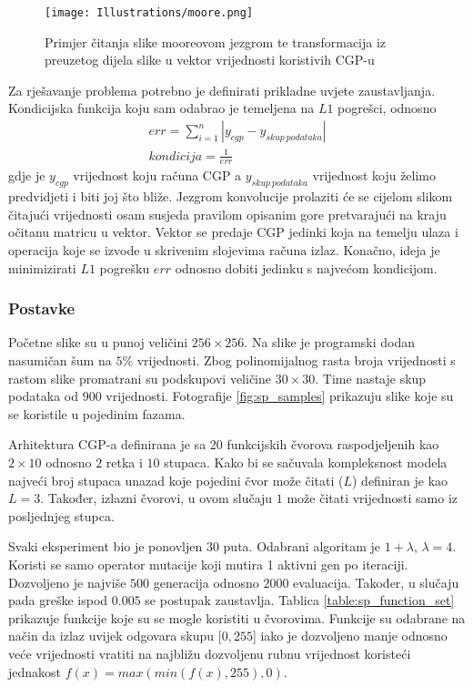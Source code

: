 \begin{figure}
	\centering
	\texttt{[image: Illustrations/moore.png]}
	\caption{Primjer čitanja slike mooreovom jezgrom te transformacija iz preuzetog dijela slike u vektor vrijednosti koristivih CGP-u}
	\label{fig:moore_example}
\end{figure}

Za rješavanje problema potrebno je definirati prikladne uvjete zaustavljanja.
Kondicijska funkcija koju sam odabrao je temeljena na $L1$ pogrešci, odnosno
\begin{gather*}
err = \sum_{i=1}^{n} |y_{cgp} - y_{skup\ podataka}| \\
kondicija = \frac{1}{err}
\end{gather*}
gdje je $y_{cgp}$ vrijednost koju računa CGP a $y_{skup\ podataka}$ vrijednost koju želimo predvidjeti i biti joj što bliže.
Jezgrom konvolucije prolaziti će se cijelom slikom čitajući vrijednosti osam susjeda pravilom opisanim gore pretvarajući na kraju očitanu matricu u vektor.
Vektor se predaje CGP jedinki koja na temelju ulaza i operacija koje se izvode u skrivenim slojevima računa izlaz.
Konačno, ideja je minimizirati $L1$ pogrešku $err$ odnosno dobiti jedinku s najvećom kondicijom.

\subsubsection{Postavke}
Početne slike su u punoj veličini $256 \times 256$.
Na slike je programski dodan nasumičan šum na $5\%$ vrijednosti.
Zbog polinomijalnog rasta broja vrijednosti s rastom slike promatrani su podskupovi veličine $30 \times 30$.
Time nastaje skup podataka od $900$ vrijednosti.
Fotografije \ref{fig:sp_samples} prikazuju slike koje su se koristile u pojedinim fazama.

Arhitektura CGP-a definirana je sa $20$ funkcijskih čvorova raspodjeljenih kao $2 \times 10$ odnosno $2$ retka i $10$ stupaca.
Kako bi se sačuvala kompleksnost modela najveći broj stupaca unazad koje pojedini čvor može čitati ($L$) definiran je kao $L = 3$.
Također, izlazni čvorovi, u ovom slučaju $1$ može čitati vrijednosti samo iz posljednjeg stupca.

Svaki eksperiment bio je ponovljen 30 puta.
Odabrani algoritam je $1 + \lambda$, $\lambda = 4$.
Koristi se samo operator mutacije koji mutira 1 aktivni gen po iteraciji.
Dozvoljeno je najviše $500$ generacija odnosno $2000$ evaluacija.
Također, u slučaju pada greške ispod $0.005$ se postupak zaustavlja.
Tablica \ref{table:sp_function_set} prikazuje funkcije koje su se mogle koristiti u čvorovima.
Funkcije su odabrane na način da izlaz uvijek odgovara skupu $[0, 255$] iako je dozvoljeno manje odnosno veće vrijednosti vratiti na najbližu dozvoljenu rubnu vrijednost koristeći jednakost $f(x) = max(min(f(x), 255), 0)$.

